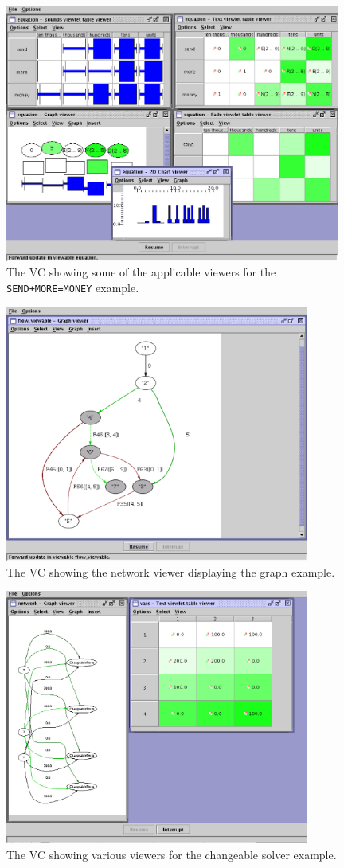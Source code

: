\begin{figure}[htp]
\centering
\includegraphics[width=11cm]{vcallviewers}
\caption{The VC showing some of the applicable viewers for the \texttt{SEND+MORE=MONEY} example.}
\label{fig:allviewers}
\end{figure}

\begin{figure}[htp]
\centering
\includegraphics[width=10cm]{vcnetworkviewer}
\caption{The VC showing the network viewer displaying the graph example.}
\label{fig:networkviewer}
\end{figure}

\begin{figure}[htp]
\centering
\includegraphics[width=10cm]{vcchangeableexample}
\caption{The VC showing various viewers for the changeable solver example.}
\label{fig:changeableexample}
\end{figure}

